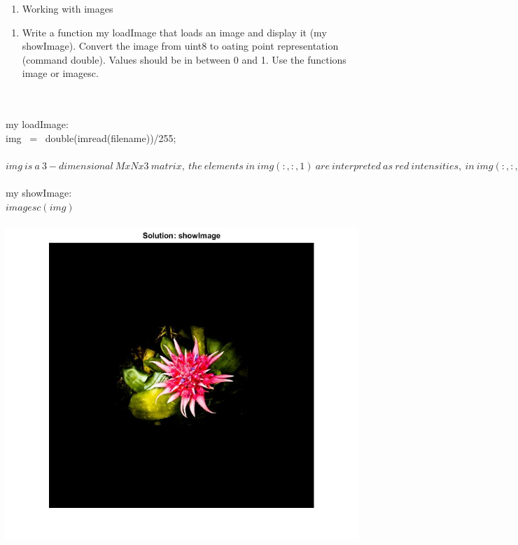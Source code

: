 



\graphicspath{ {images/} }

 
    \begin{enumerate}
         \item[Exercise 1:] Working with images
    \end{enumerate}
    \begin{enumerate}
        \item[(a)] {Write a function my loadImage that loads an image and display it (my showImage). Convert the image from uint8 to oating point representation (command double). Values should be in between 0 and 1. Use the functions image or imagesc.}
    \end{enumerate}
        \\
        \\ my loadImage:
        \\  img \ = \ double(imread(filename))/255;
        \\\\ $img \ is \ a \ 3-dimensional \ MxNx3 \ matrix, \ the \ elements \ in \ img(:,:,1) \ are \ interpreted \ as \ red \ intensities, \ in \ img(:,:,2) \ as \ green \ intensities, \ and \ in \ img(:,:,3) \ as \ blue \ intensities.$
        \\\\ my showImage:
        \\ $ imagesc(img) $
        \\\\
    	\centering
        \includegraphics[scale=0.58]{images/SolutionFirstPart.jpg} 
